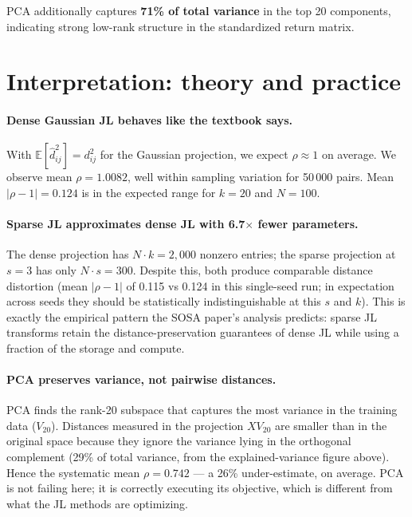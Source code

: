 \documentclass[11pt]{article}
\begin{document}
PCA additionally captures \textbf{71\% of total variance} in the top 20 components, indicating strong low-rank structure in the standardized return matrix.

\section{Interpretation: theory and practice}

\paragraph{Dense Gaussian JL behaves like the textbook says.}
With $\mathbb{E}[\hat{d}_{ij}^2] = d_{ij}^2$ for the Gaussian projection, we expect $\rho \approx 1$ on average. We observe mean $\rho = 1.0082$, well within sampling variation for 50\,000 pairs. Mean $|\rho - 1| = 0.124$ is in the expected range for $k = 20$ and $N = 100$.

\paragraph{Sparse JL approximates dense JL with 6.7$\times$ fewer parameters.}
The dense projection has $N \cdot k = 2{,}000$ nonzero entries; the sparse projection at $s = 3$ has only $N \cdot s = 300$. Despite this, both produce comparable distance distortion (mean $|\rho - 1|$ of 0.115 vs 0.124 in this single-seed run; in expectation across seeds they should be statistically indistinguishable at this $s$ and $k$). This is exactly the empirical pattern the SOSA paper's analysis predicts: sparse JL transforms retain the distance-preservation guarantees of dense JL while using a fraction of the storage and compute.

\paragraph{PCA preserves variance, not pairwise distances.}
PCA finds the rank-20 subspace that captures the most variance in the training data ($V_{20}$). Distances measured in the projection $X V_{20}$ are smaller than in the original space because they ignore the variance lying in the orthogonal complement (29\% of total variance, from the explained-variance figure above). Hence the systematic mean $\rho = 0.742$ --- a 26\% under-estimate, on average. PCA is not failing here; it is correctly executing its objective, which is different from what the JL methods are optimizing.
\end{document}

